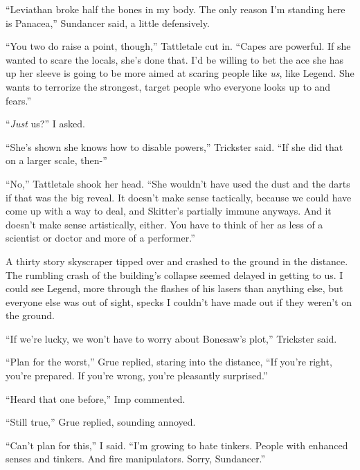 ``Leviathan broke half the bones in my body.  The only reason I'm standing here is Panacea,'' Sundancer said, a little defensively.



``You two do raise a point, though,'' Tattletale cut in.  ``Capes are powerful.  If she wanted to scare the locals, she's done that.  I'd be willing to bet the ace she has up her sleeve is going to be more aimed at scaring people like \emph{us}, like Legend.  She wants to terrorize the strongest, target people who everyone looks up to and fears.''



``\emph{Just} us?'' I asked.



``She's shown she knows how to disable powers,'' Trickster said.  ``If she did that on a larger scale, then-''



``No,'' Tattletale shook her head.  ``She wouldn't have used the dust and the darts if that was the big reveal.  It doesn't make sense tactically, because we could have come up with a way to deal, and Skitter's partially immune anyways.  And it doesn't make sense artistically, either.  You have to think of her as less of a scientist or doctor and more of a performer.''



A thirty story skyscraper tipped over and crashed to the ground in the distance.  The rumbling crash of the building's collapse seemed delayed in getting to us.  I could see Legend, more through the flashes of his lasers than anything else, but everyone else was out of sight, specks I couldn't have made out if they weren't on the ground.



``If we're lucky, we won't have to worry about Bonesaw's plot,'' Trickster said.



``Plan for the worst,'' Grue replied, staring into the distance, ``If you're right, you're prepared.  If you're wrong, you're pleasantly surprised.''



``Heard that one before,'' Imp commented.



``Still true,'' Grue replied, sounding annoyed.



``Can't plan for this,'' I said.  ``I'm growing to hate tinkers.  People with enhanced senses and tinkers.  And fire manipulators.  Sorry, Sundancer.''



